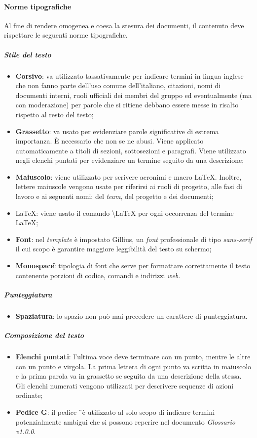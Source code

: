 \paragraph{Norme tipografiche}
\label{sec:normeTipografiche}
Al fine di rendere omogenea e coesa la stesura dei documenti, il contenuto deve rispettare le seguenti norme tipografiche.
\subparagraph{Stile del testo}
\begin{itemize}
\item \textbf{Corsivo}: va utilizzato tassativamente per indicare termini in lingua inglese che non fanno parte dell'uso comune dell'italiano, citazioni, nomi di documenti interni, ruoli ufficiali dei membri del gruppo ed eventualmente (ma con moderazione) per parole che si ritiene debbano essere messe in risalto rispetto al resto del testo; 
\item \textbf{Grassetto}: va usato per evidenziare parole significative di estrema importanza. È necessario che non se ne abusi. Viene applicato automaticamente a titoli di sezioni, sottosezioni e paragrafi. Viene utilizzato negli elenchi puntati per evidenziare un termine seguito da una descrizione;
\item \textbf{Maiuscolo}: viene utilizzato per scrivere acronimi e macro \LaTeX. Inoltre, lettere maiuscole vengono usate per riferirsi ai ruoli di progetto, alle fasi di lavoro e ai seguenti nomi: del \textit{team}, del progetto e dei documenti;
\item \LaTeX: viene usato il comando \textbackslash LaTeX per ogni occorrenza del termine \LaTeX;
\item \textbf{Font}: nel \textit{template} è impostato Gillius, un \textit{font} professionale di tipo \textit{sans-serif} il cui scopo è garantire maggiore leggibilità del testo su schermo;
\item \textbf{Monospace}\G: tipologia di font che serve per formattare correttamente il testo contenente porzioni di codice, comandi e indirizzi \textit{web}.
\end{itemize}
\subparagraph{Punteggiatura}
\begin{itemize}
\item \textbf{Spaziatura}: lo spazio non può mai precedere un carattere di punteggiatura.
\end{itemize} 
\subparagraph{Composizione del testo}
\begin{itemize}
	\item {\textbf{Elenchi puntati}}: l’ultima voce deve terminare con un punto, mentre le altre con un punto e virgola. La prima lettera di ogni punto va scritta in maiuscolo e la prima parola va in grassetto se seguita da una descrizione della stessa. Gli elenchi numerati vengono utilizzati per descrivere sequenze di azioni ordinate;
	\item \textbf{Pedice G}: il pedice \G\ è utilizzato al solo scopo di indicare termini potenzialmente ambigui che si possono reperire nel documento \textit{Glossario v1.0.0}.
\end{itemize}

